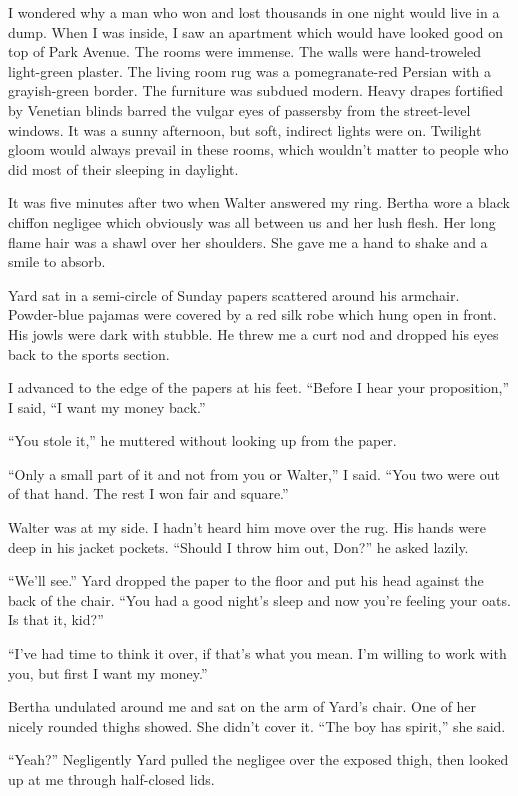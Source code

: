 \documentclass{novel}
\begin{document}
I wondered why a man who won and lost thousands in one night would live in a dump. When I was inside, I saw an apartment which would have looked good on top of Park Avenue. The rooms were immense. The walls were hand-troweled light-green plaster. The living room rug was a pomegranate-red Persian with a grayish-green border. The furniture was subdued modern. Heavy drapes fortified by Venetian blinds barred the vulgar eyes of passersby from the street-level windows. It was a sunny afternoon, but soft, indirect lights were on. Twilight gloom would always prevail in these rooms, which wouldn’t matter to people who did most of their sleeping in daylight.

It was five minutes after two when Walter answered my ring. Bertha wore a black chiffon negligee which obviously was all between us and her lush flesh. Her long flame hair was a shawl over her shoulders. She gave me a hand to shake and a smile to absorb.

Yard sat in a semi-circle of Sunday papers scattered around his armchair. Powder-blue pajamas were covered by a red silk robe which hung open in front. His jowls were dark with stubble. He threw me a curt nod and dropped his eyes back to the sports section.

I advanced to the edge of the papers at his feet. “Before I hear your proposition,” I said, “I want my money back.”

“You stole it,” he muttered without looking up from the paper.

“Only a small part of it and not from you or Walter,” I said. “You two were out of that hand. The rest I won fair and square.”

Walter was at my side. I hadn’t heard him move over the rug. His hands were deep in his jacket pockets. “Should I throw him out, Don?” he asked lazily.

“We’ll see.” Yard dropped the paper to the floor and put his head against the back of the chair. “You had a good night’s sleep and now you’re feeling your oats. Is that it, kid?”

“I’ve had time to think it over, if that’s what you mean. I’m willing to work with you, but first I want my money.”

Bertha undulated around me and sat on the arm of Yard’s chair. One of her nicely rounded thighs showed. She didn’t cover it. “The boy has spirit,” she said.

“Yeah?” Negligently Yard pulled the negligee over the exposed thigh, then looked up at me through half-closed lids.
\end{document}

